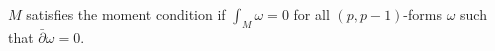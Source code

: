 
$M$ satisfies the moment condition if $\int_M \omega = 0$ for all $(p, p-1)$-forms $\omega$ such that $\bar{\partial}\omega = 0$.
